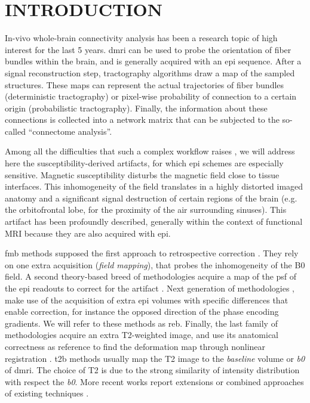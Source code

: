 \section{INTRODUCTION}
\label{sec:intro}
In-vivo whole-brain connectivity analysis has been a
research topic of high interest for the last
5 years. 
\Gls*{dmri} can be used to probe the
orientation of fiber bundles within the brain,
and is generally acquired with an \gls*{epi} sequence.
After a signal reconstruction step, 
tractography algorithms draw a map of the sampled 
structures.
These maps can represent the actual trajectories
of fiber bundles (deterministic tractography) or
pixel-wise probability of connection to a certain origin
(probabilistic tractography). Finally, the
information about these connections is collected
into a network matrix that can be subjected to
the so-called ``connectome analysis''.

Among all the difficulties that such a complex workflow
raises \cite{jones_twenty-five_2010}, we will
address here the susceptibility-derived artifacts,
for which \Gls*{epi} schemes are especially sensitive.
Magnetic susceptibility disturbs the magnetic field 
close to tissue interfaces. This inhomogeneity 
of the field translates in a highly distorted imaged 
anatomy and a significant signal destruction of 
certain regions of the brain 
(e.g. the orbitofrontal lobe, for the proximity of the
air surrounding sinuses). This artifact has been
profoundly described, generally within the context of
functional MRI because they are also acquired with 
\gls*{epi}. 

\Gls*{fmb} methods supposed the first approach to retrospective
correction \cite{jezzard_correction_1995}. They rely on one
extra acquisition (\emph{field mapping}), that probes the 
inhomogeneity of the B0 field.
A second theory-based breed of methodologies acquire a 
map of the \acrlong*{psf} of the \gls*{epi} readouts to correct 
for the artifact \cite{robson_measurement_1997}. 
Next generation of methodologies \cite{cordes_geometric_2000,
chiou_simple_2000}, make use of the acquisition of 
extra \gls*{epi} volumes 
with specific differences that enable correction, for instance
the opposed direction of the phase encoding gradients. We will
refer to these methods as \gls*{reb}.
Finally, the last family of methodologies acquire an 
extra T2-weighted image, and use its anatomical correctness 
as reference to find the deformation map through nonlinear 
registration \cite{kybic_unwarping_2000,studholme_accurate_2000}.
\gls*{t2b} methods usually map
the T2 image to the \emph{baseline} volume or \textit{b0}
of \gls*{dmri}. The choice of T2 is due to the strong
similarity of intensity distribution with respect the \textit{b0}.
More recent works report extensions or combined
approaches of existing techniques
\cite{andersson_how_2003,zaitsev_point_2004,%
holland_efficient_2010,andersson_comprehensive_2012}.

